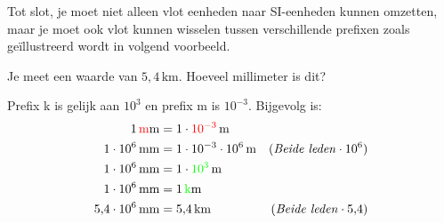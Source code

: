 \documentclass{ximera}
\begin{document}
Tot slot, je moet niet alleen vlot eenheden naar SI-eenheden kunnen omzetten, maar je moet ook vlot kunnen wisselen tussen verschillende prefixen zoals geïllustreerd wordt in volgend voorbeeld.

\begin{example}[foldable=true,title={Voorbeeld: Kilometer naar millimeter omzetten}]\nl
    Je meet een waarde van $5{,}4 \, \mathrm{km}$. Hoeveel millimeter is dit?

    \begin{solution}\nl
    Prefix k is gelijk aan $10^{3}$ en prefix m is $10^{-3}$. Bijgevolg is:
    \begin{align*}
    1 \, \textcolor{red}{\mathrm{m}}\mathrm{m} & = 1 \cdot \textcolor{red}{10^{-3}} \, \mathrm{m} & \\
    1 \cdot 10^{6} \, \mathrm{mm} & = 1 \cdot 10^{-3} \cdot 10^{6} \, \mathrm{m} & (\text{\textit{Beide leden}} \cdot 10^{6}) \\
    1 \cdot 10^{6} \, \mathrm{mm} & = 1 \cdot \textcolor{green}{10^{3}} \, \mathrm{m} & \\
    1 \cdot 10^{6} \, \mathrm{mm} & = 1 \, \textcolor{green}{\mathrm{k}}\mathrm{m} & \\
    5{,}4 \cdot 10^{6} \, \mathrm{mm} & = 5{,}4 \, \mathrm{km} & (\text{\textit{Beide leden}} \cdot 5{,}4) \\
    \end{align*}
    \end{solution}
\end{example}
\end{document}
